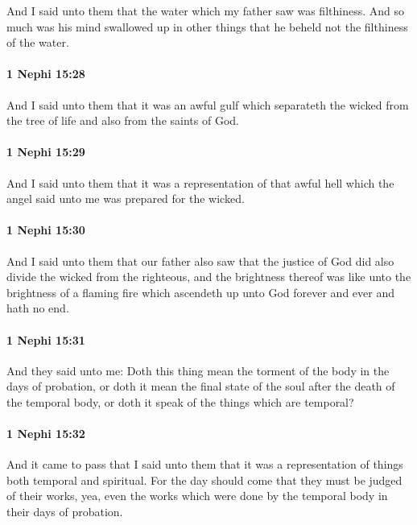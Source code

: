 			And I said unto them that the water which my father saw was filthiness.
			And so much was his mind swallowed up in other things
			that he beheld not the filthiness of the water.

		\paragraph{1 Nephi 15:28} %
			\label{1NEPHI-15-28}

			And I said unto them that it was an awful gulf
			which separateth the wicked from the tree of life and also from the saints of God.

		\paragraph{1 Nephi 15:29} %
			\label{1NEPHI-15-29}

			And I said unto them that it was a representation of that awful hell
			which the angel said unto me was prepared for the wicked.

		\paragraph{1 Nephi 15:30} %
			\label{1NEPHI-15-30}

			And I said unto them that our father also saw
			that the justice of God did also divide the wicked from the righteous,
			and the brightness thereof was like unto the brightness of a flaming fire
			which ascendeth up unto God forever and ever and hath no end.

		\paragraph{1 Nephi 15:31} %
			\label{1NEPHI-15-31}

			And they said unto me:
			Doth this thing mean the torment of the body in the days of probation,
			or doth it mean the final state of the soul after the death of the temporal body,
			or doth it speak of the things which are temporal?

		\paragraph{1 Nephi 15:32} %
			\label{1NEPHI-15-32}

			And it came to pass that I said unto them
			that it was a representation of things both temporal and spiritual.
			For the day should come that they must be judged of their works,
			yea, even the works which were done by the temporal body
			in their days of probation.

